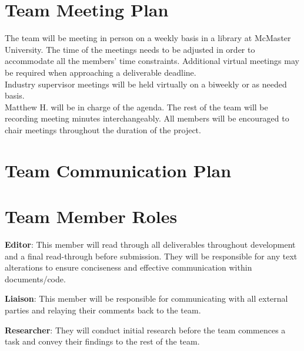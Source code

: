 \documentclass{article}
\begin{document}

\section{Team Meeting Plan}

The team will be meeting in person on a weekly basis in a library at McMaster University. The time of the meetings
needs to be adjusted in order to accommodate all the members' time constraints.
Additional virtual meetings may be required when approaching a deliverable deadline.\\
Industry supervisor meetings will be held virtually on a biweekly or as needed basis. \\

Matthew H. will be in charge of the agenda. The rest of the team will be recording meeting minutes interchangeably. All members will be encouraged
to chair meetings throughout the duration of the project. 

\section{Team Communication Plan}



\section{Team Member Roles}


\textbf{Editor}: This member will read through all deliverables throughout development and a final read-through before submission. They will be responsible for any
text alterations to ensure conciseness and effective communication within documents/code.

\textbf{Liaison}: This member will be responsible for communicating with all external parties and relaying their comments back to the team.

\textbf{Researcher}: They will conduct initial research before the team commences a task and convey their findings to the rest of the team.
\end{document}
